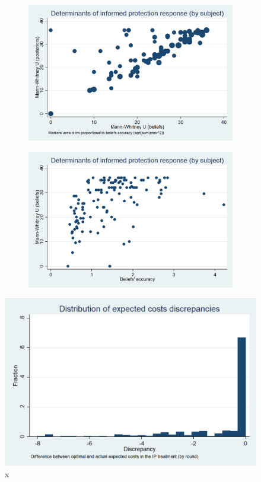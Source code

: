 \documentclass[11pt,a4paper]{article}
\begin{document}
\begin{figure}[!h]
\centering
\caption{Following beliefs vs following posterior probabilities in IP} \label{ref_question}
\begin{subfigure}[t]{.48\textwidth}
  \centering
  \includegraphics[width=\textwidth]{Graphs/clustering.png}
\end{subfigure}
\begin{subfigure}[t]{.48\textwidth}
  \centering
  \includegraphics[width=\textwidth]{Graphs/clustering2.png}
\end{subfigure}
\end{figure}


\begin{figure}[!h]
\centering
\caption{x} \label{cost_discrepancy}

  \centering
  \includegraphics[width=\textwidth]{Graphs/hist_costs_discr.png}

\end{figure}
\end{document}
